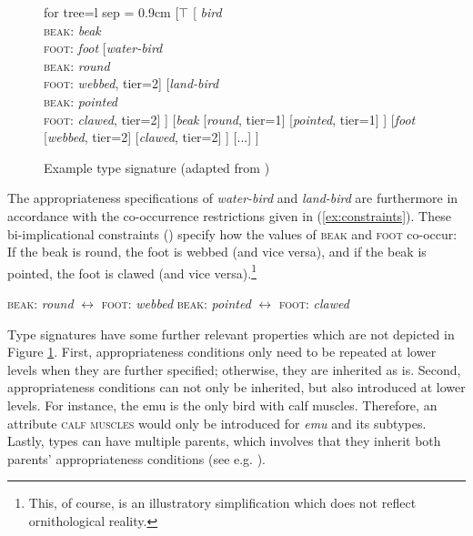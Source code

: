 \begin{figure}
	\centering
		\begin{forest} for tree={l sep = 0.9cm}
			[$\top$
			[ \textit{bird}\\{\textsc{beak:} \textit{beak}}\\{\textsc{foot:} \textit{foot}}
			[\textit{water-bird}\\{\textsc{beak:} \textit{round}}\\{\textsc{foot:} \textit{webbed}}, tier=2]
			[\textit{land-bird}\\{\textsc{beak:} \textit{pointed}}\\{\textsc{foot:} \textit{clawed}}, tier=2]
			]
			[\textit{beak}
			[\textit{round}, tier=1]
			[\textit{pointed}, tier=1]
			]
			[\textit{foot}
			[\textit{webbed}, tier=2]
			[\textit{clawed}, tier=2]
			]
			[{...}]
			]
		\end{forest}
	\caption[Example type signature]{\label{fig:typebirds}Example type signature (adapted from \citealt{Gamerschlag.2014a})}
\end{figure}    

The appropriateness specifications of \textit{water-bird} and \textit{land-bird} are furthermore in accordance with the 
 co-occurrence restrictions given in (\ref{ex:constraints}). These bi-implicational constraints (\citealt[8]{Gamerschlag.2014a}) specify how the values of \textsc{beak} and \textsc{foot} co-occur: If the beak is round, the foot is webbed (and vice versa), and if the beak is pointed, the foot is clawed (and vice versa).\footnote{This, of course, is an illustratory simplification which does not reflect ornithological reality.}
 
 \begin{exe}
 	\ex \label{ex:constraints}
\textsc{beak}: \textit{round} $\leftrightarrow$ \textsc{foot}: \textit{webbed}
 \textsc{beak}: \textit{pointed} $\leftrightarrow$ \textsc{foot}: \textit{clawed}
 \end{exe}
Type signatures have some further relevant properties which are not depicted in Figure \ref{fig:typebirds}.
First, appropriateness conditions only need to be repeated at lower levels when they are further specified; otherwise, they are inherited as is.
Second, appropriateness conditions can not only be inherited, but also introduced at lower levels. For instance, the emu is the only bird with calf muscles. Therefore, an attribute \textsc{calf muscles} would only be introduced for \textit{emu} and its subtypes.
Lastly, types can have multiple parents, which involves that they inherit both parents' appropriateness conditions (see e.g. \citealt{Kallmeyer.2013}).

